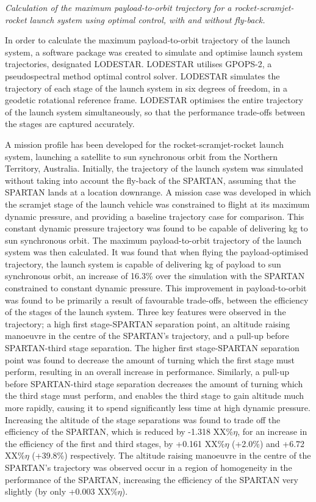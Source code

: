 	\vspace{10pt}
\emph{Calculation of the maximum payload-to-orbit trajectory for a rocket-scramjet-rocket launch system using optimal control, with and without fly-back.}

In order to calculate the maximum payload-to-orbit trajectory of the launch system, a software package was created to simulate and optimise launch system trajectories, designated LODESTAR. LODESTAR utilises GPOPS-2, a pseudospectral method optimal control solver. LODESTAR simulates the trajectory of each stage of the launch system in six degrees of freedom, in a geodetic rotational reference frame. 
LODESTAR optimises the entire trajectory of the launch system simultaneously, so that the performance trade-offs between the stages are captured accurately.

A mission profile has been developed for the rocket-scramjet-rocket launch system, launching a satellite to sun synchronous orbit from the Northern Territory, Australia. 
Initially, the trajectory of the launch system was simulated without taking into account the fly-back of the SPARTAN, assuming that the SPARTAN lands at a location downrange.
A mission case was developed in which the scramjet stage of the launch vehicle was constrained to flight at its maximum dynamic pressure, and providing a baseline trajectory case for comparison. This constant dynamic pressure trajectory was found to be capable of delivering \PayloadToOrbitConstqNoReturn kg to sun synchronous orbit. 
The maximum payload-to-orbit trajectory of the launch system was then calculated. It was found that when flying the payload-optimised trajectory, the launch system is capable of delivering \PayloadToOrbitStandardNoReturn kg of payload to sun synchronous orbit, an increase of 16.3\% over the simulation with the SPARTAN constrained to constant dynamic pressure. 
This improvement in payload-to-orbit was found to be primarily a result of favourable trade-offs, between the efficiency of the stages of the launch system.
Three key features were observed in the trajectory; a high first stage-SPARTAN separation point, an altitude raising manoeuvre in the centre of the SPARTAN's trajectory, and a pull-up before SPARTAN-third stage separation. 
The higher first stage-SPARTAN separation point was found to decrease the amount of turning which the first stage must perform, resulting in an overall increase in performance. Similarly, a pull-up before SPARTAN-third stage separation decreases the amount of turning which the third stage must perform, and enables the third stage to gain altitude much more rapidly, causing it to spend significantly less time at high dynamic pressure. 
 Increasing the altitude of the stage separations was found to trade off the efficiency of the SPARTAN, which is reduced by -1.318 XX\%$\eta$, for an increase in the efficiency of the first and third stages, by +0.161 XX\%$\eta$ (+2.0\%) and +6.72 XX\%$\eta$ (+39.8\%) respectively.
The altitude raising manoeuvre in the centre of the SPARTAN's trajectory was observed occur in a region of homogeneity in the performance of the SPARTAN, increasing the efficiency of the SPARTAN very slightly (by only +0.003 XX\%$\eta$).


